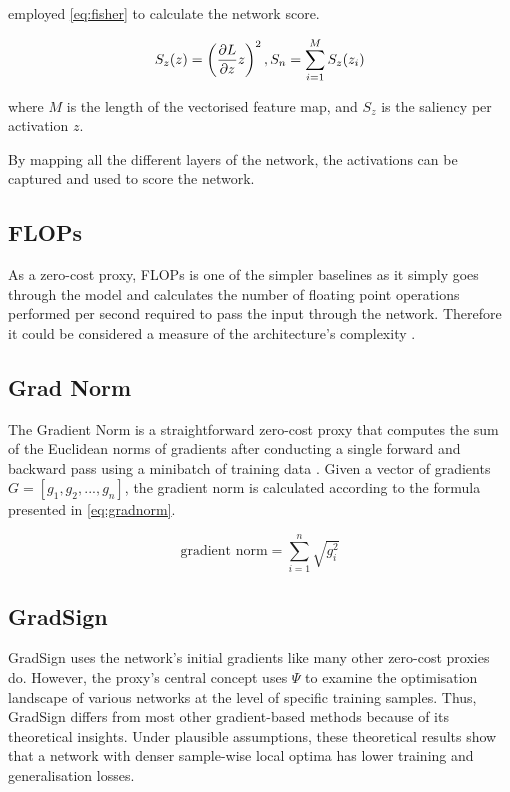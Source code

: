 \cite{DBLP:journals/corr/abs-1801-05787} employed \cref{eq:fisher} to calculate the network score. 

\begin{equation}
    \centering
    S_z(z) = \left(\frac{\partial L}{\partial z}z\right)^2, S_n = \sum_{i=1}^M S_z(z_i)
    \label{eq:fisher}
\end{equation}

where $M$ is the length of the vectorised feature map, and  $S_z$ is the saliency per activation $z$. 

By mapping all the different layers of the network, the activations can be captured and used to score the network.  

\subsection{FLOPs}
As a zero-cost proxy, \Gls{FLOPs} is one of the simpler baselines as it simply goes through the model and calculates the number of floating point operations performed per second required to pass the input through the network. Therefore it could be considered a measure of the architecture's complexity \autocite{ning2021evaluating}. 


\subsection{Grad Norm}
The Gradient Norm is a straightforward zero-cost proxy that computes the sum of the Euclidean norms of gradients after conducting a single forward and backward pass using a minibatch of training data \autocite{abdelfattah2021zero}. Given a vector of gradients \(G = [g_1, g_2, ..., g_n]\), the gradient norm is calculated according to the formula presented in \cref{eq:gradnorm}.

\begin{equation}\label{eq:gradnorm}
\text{gradient norm} = \sum_{i=1}^n \sqrt{g_i^2}
\end{equation}


\subsection{GradSign}
GradSign uses the network's initial gradients like many other zero-cost proxies do. However, the proxy's central concept uses $\Psi$ to examine the optimisation landscape of various networks at the level of specific training samples. Thus, GradSign differs from most other gradient-based methods because of its theoretical insights. Under plausible assumptions, these theoretical results show that a network with denser sample-wise local optima has lower training and generalisation losses.

